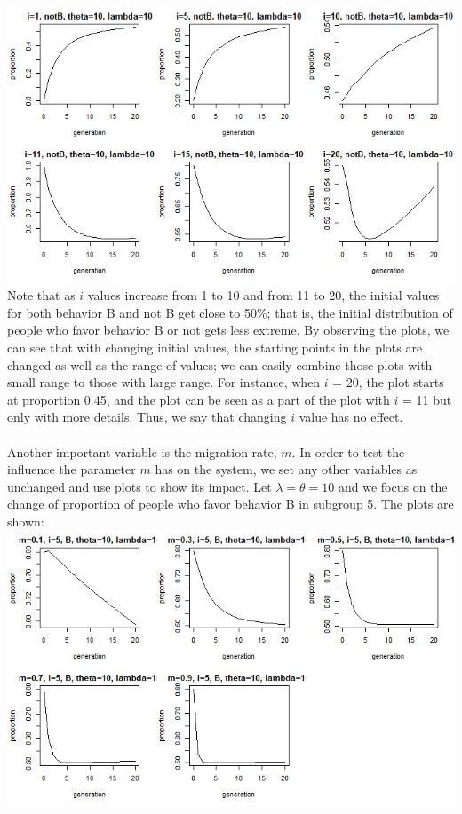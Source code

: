 \documentclass[a4paper,8pt]{extarticle}
\begin{document}
\\
\includegraphics[scale = 0.6]{000047.png}
\\
Note that as $i$ values increase from 1 to 10 and from 11 to 20, the initial values for both behavior B and not B get close to 50\%; that is, the initial distribution of people who favor behavior B or not gets less extreme. By observing the plots, we can see that with changing initial values, the starting points in the plots are changed as well as the range of values; we can easily combine those plots with small range to those with large range. For instance, when $i$ = 20, the plot starts at proportion 0.45, and the plot can be seen as a part of the plot with $i$ = 11 but only with more details. Thus, we say that changing $i$ value has no effect.
\\
\\
Another important variable is the migration rate, $m$. In order to test the influence the parameter $m$ has on the system, we set any other variables as unchanged and use plots to show its impact. Let $\lambda = \theta = 10$ and we focus on the change of proportion of people who favor behavior B in subgroup 5. The plots are shown:
\\
\includegraphics[scale = 0.6]{00002d1.png}
\end{document}
